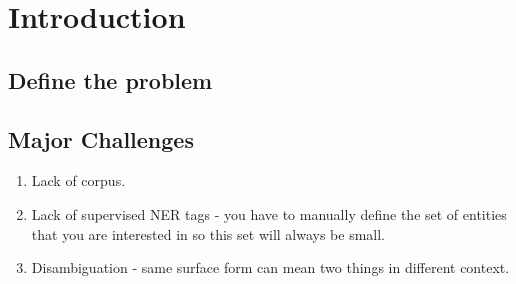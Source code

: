 \section{Introduction}
\label{sec:intro}
\subsection{Define the problem}

\subsection{Major Challenges}
\begin{enumerate}
	\item Lack of corpus.
	\item Lack of supervised NER tags - you have to manually define the set of entities that you are interested in so this set will always be small. 
	\item Disambiguation - same surface form can mean two things in different context.
\end{enumerate}
